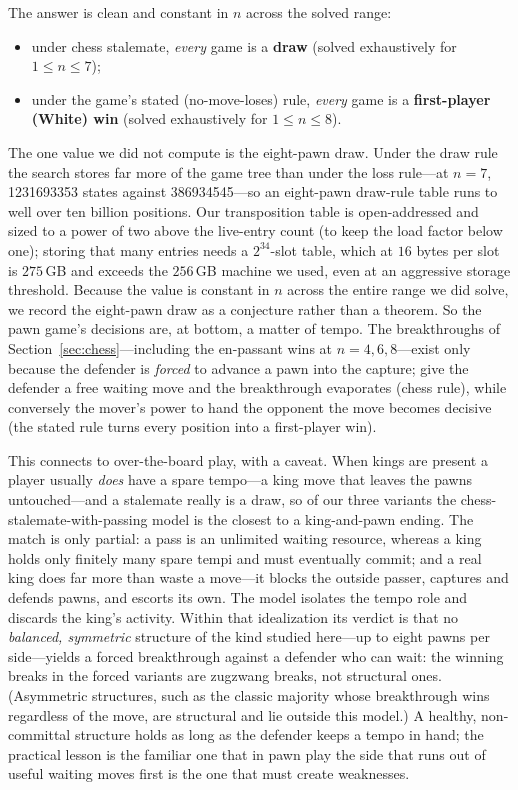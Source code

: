 \documentclass[Afour,sageapa,times]{sagej}
\theoremstyle{plain}
\theoremstyle{definition}
\newcommand{\passSevenLossStates}{\num{386934545}}    %
\newcommand{\passSevenDrawStates}{\num{1231693353}}   %
\newcommand{\passLossMaxN}{8}   %
\newcommand{\passDrawMaxN}{7}   %
\begin{document}
The answer is clean and constant in $n$ across the solved range:
%
\begin{itemize}
  \item under chess stalemate, \emph{every} game is a \textbf{draw}
        (solved exhaustively for $1\le n\le\passDrawMaxN$);
  \item under the game's stated (no-move-loses) rule, \emph{every} game is a
        \textbf{first-player (White) win}
        (solved exhaustively for $1\le n\le\passLossMaxN$).
\end{itemize}
%
The one value we did not compute is the eight-pawn draw. Under the draw rule the
search stores far more of the game tree than under the loss rule---at $n=7$,
\passSevenDrawStates{} states against \passSevenLossStates{}---so an eight-pawn
draw-rule table runs to well over ten billion positions. Our transposition table is
open-addressed and sized to a power of two above the live-entry count (to keep the
load factor below one); storing that many entries needs a $2^{34}$-slot table, which
at $16$ bytes per slot is $275$\,GB and exceeds the $256$\,GB machine we used, even
at an aggressive storage threshold. Because the value is constant in $n$ across the
entire range we did solve, we record the eight-pawn draw as a conjecture rather than
a theorem.
%
So the pawn game's decisions are, at bottom, a matter of tempo. The breakthroughs of
Section~\ref{sec:chess}---including the en-passant wins at $n=4,6,8$---exist only
because the defender is \emph{forced} to advance a pawn into the capture; give the
defender a free waiting move and the breakthrough evaporates (chess rule), while
conversely the mover's power to hand the opponent the move becomes decisive (the
stated rule turns every position into a first-player win).

This connects to over-the-board play, with a caveat. When kings are present a player
usually \emph{does} have a spare tempo---a king move that leaves the pawns
untouched---and a stalemate really is a draw, so of our three variants the
chess-stalemate-with-passing model is the closest to a king-and-pawn ending. The
match is only partial: a pass is an unlimited waiting resource, whereas a king holds
only finitely many spare tempi and must eventually commit; and a real king does far
more than waste a move---it blocks the outside passer, captures and defends pawns,
and escorts its own. The model isolates the tempo role and discards the king's
activity. Within that idealization its verdict is that no \emph{balanced, symmetric}
structure of the kind studied here---up to eight pawns per side---yields a forced
breakthrough against a defender who can wait: the winning breaks in the forced
variants are zugzwang breaks, not structural ones. (Asymmetric structures, such as
the classic majority whose breakthrough wins regardless of the move, are structural
and lie outside this model.) A healthy, non-committal structure holds as long as the
defender keeps a tempo in hand; the practical lesson is the familiar one that in pawn
play the side that runs out of useful waiting moves first is the one that must create
weaknesses.
\end{document}

